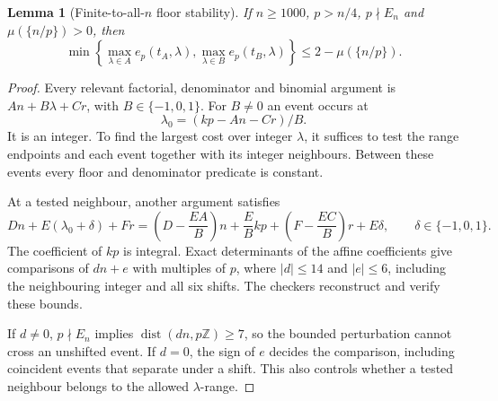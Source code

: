 \documentclass[11pt]{amsart}
\newcommand{\Z}{\mathbb Z}
\theoremstyle{plain}
\newtheorem{lemma}[theorem]{Lemma}
\theoremstyle{remark}\newtheorem{remark}[theorem]{Remark}
\numberwithin{equation}{section}
\begin{document}
\begin{lemma}[Finite-to-all-$n$ floor stability]\label{t:lem:stability}
If $n\ge1000$, $p>n/4$, $p\nmid E_n$ and $\mu(\{n/p\})>0$, then
\begin{equation}\label{t:eq:floor-result}
 \min\left\{\max_{\lambda\in A}e_p(t_A,\lambda),
             \max_{\lambda\in B}e_p(t_B,\lambda)\right\}
 \le 2-\mu(\{n/p\}).
\end{equation}
\end{lemma}
\begin{proof}
Every relevant factorial, denominator and binomial argument is
$An+B\lambda+Cr$, with $B\in\{-1,0,1\}$. For $B\ne0$ an event occurs at
\[
 \lambda_0=(kp-An-Cr)/B.
\]
It is an integer. To find the largest cost over integer $\lambda$, it
suffices to test the range endpoints and each event together with its
integer neighbours. Between these events every floor and denominator
predicate is constant.

At a tested neighbour, another argument satisfies
\[
 Dn+E(\lambda_0+\delta)+Fr
 =\left(D-\frac{EA}{B}\right)n+\frac EBkp
   +\left(F-\frac{EC}{B}\right)r+E\delta,
 \qquad\delta\in\{-1,0,1\}.
\]
The coefficient of $kp$ is integral. Exact determinants of the affine
coefficients give comparisons of $dn+e$ with multiples of $p$, where
$|d|\le14$ and $|e|\le6$, including the neighbouring integer and all six
shifts. The checkers reconstruct and verify these bounds.

If $d\ne0$, $p\nmid E_n$ implies
$\operatorname{dist}(dn,p\Z)\ge7$, so the bounded perturbation cannot cross
an unshifted event. If $d=0$, the sign of $e$ decides the comparison,
including coincident events that separate under a shift. This also controls
whether a tested neighbour belongs to the allowed $\lambda$-range.


\end{proof}
\end{document}
